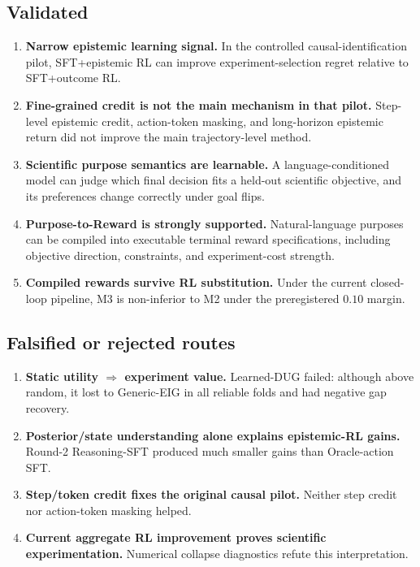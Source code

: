 \documentclass[11pt]{article}
\begin{document}
\subsection{Validated}
\begin{enumerate}
    \item \textbf{Narrow epistemic learning signal.} In the controlled causal-identification pilot, SFT+epistemic RL can improve experiment-selection regret relative to SFT+outcome RL.
    \item \textbf{Fine-grained credit is not the main mechanism in that pilot.} Step-level epistemic credit, action-token masking, and long-horizon epistemic return did not improve the main trajectory-level method.
    \item \textbf{Scientific purpose semantics are learnable.} A language-conditioned model can judge which final decision fits a held-out scientific objective, and its preferences change correctly under goal flips.
    \item \textbf{Purpose-to-Reward is strongly supported.} Natural-language purposes can be compiled into executable terminal reward specifications, including objective direction, constraints, and experiment-cost strength.
    \item \textbf{Compiled rewards survive RL substitution.} Under the current closed-loop pipeline, M3 is non-inferior to M2 under the preregistered $0.10$ margin.
\end{enumerate}

\subsection{Falsified or rejected routes}
\begin{enumerate}
    \item \textbf{Static utility $\Rightarrow$ experiment value.} Learned-DUG failed: although above random, it lost to Generic-EIG in all reliable folds and had negative gap recovery.
    \item \textbf{Posterior/state understanding alone explains epistemic-RL gains.} Round-2 Reasoning-SFT produced much smaller gains than Oracle-action SFT.
    \item \textbf{Step/token credit fixes the original causal pilot.} Neither step credit nor action-token masking helped.
    \item \textbf{Current aggregate RL improvement proves scientific experimentation.} Numerical collapse diagnostics refute this interpretation.
\end{enumerate}
\end{document}
